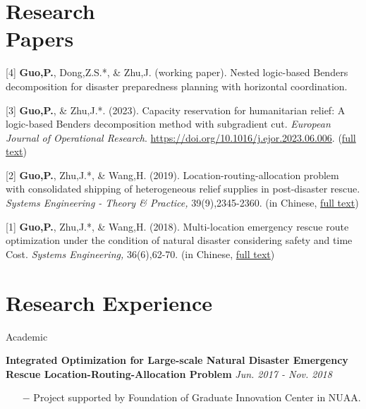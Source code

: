 \documentclass[margin]{res}
\begin{document}
\begin{resume}
\vspace{-.8em}
\section{\sc Research \\Papers}


[4] \textbf{Guo,P.}, Dong,Z.S.*, \& Zhu,J. (working paper). Nested logic-based Benders decomposition for disaster preparedness planning with horizontal coordination.
\vspace{-.8em}

[3] \textbf{Guo,P.}, \& Zhu,J.*. (2023). Capacity reservation for humanitarian relief: A logic-based Benders decomposition method with subgradient cut. \textit{European Journal of Operational Research}. \url{https://doi.org/10.1016/j.ejor.2023.06.006}. (\href{https://guo.ph/publication/CapacityReservationHumanitarian2023.pdf}{full text})
\vspace{-.8em}

[2] \textbf{Guo,P.}, Zhu,J.*, \& Wang,H. (2019). Location-routing-allocation problem with consolidated shipping of heterogeneous relief supplies in post-disaster rescue. \textit{Systems Engineering - Theory \& Practice,} 39(9),2345-2360. (in Chinese, \href{https://guo.ph/publication/zh-LocationRoutingAllocation.pdf}{full text})
\vspace{-.8em}

[1] \textbf{Guo,P.}, Zhu,J.*, \& Wang,H. (2018). Multi-location emergency rescue route optimization under the condition of natural disaster considering safety and time Cost. \textit{Systems Engineering,} 36(6),62-70. (in Chinese, \href{https://guo.ph/publication/zh-RiskTime.pdf}{full text})

\vspace{-.8em}
\section{\sc Research Experience}


{\sc Academic}
\vspace{-.8em}

\textbf{{Integrated Optimization for Large-scale Natural Disaster Emergency Rescue Location-Routing-Allocation Problem}} \hspace{65pt} {\it Jun. 2017 - Nov. 2018}
\begin{itemize} \itemsep -2pt  %
\item[\(-\)] Project supported by {Foundation of Graduate Innovation Center in NUAA}.
\end{itemize}



\end{resume}
\end{document}
